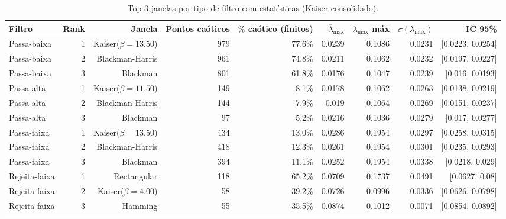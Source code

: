\begin{table}[htbp]
  \centering
  \caption{Top-3 janelas por tipo de filtro com estatísticas (Kaiser consolidado).}
  \begin{tabular}{lrrrrrrrr}
    \toprule
    Filtro & Rank & Janela & Pontos caóticos & $\%$ caótico (finitos) & $\overline{\lambda}_{\max}$ & $\lambda_{\max}$ máx & $\sigma(\lambda_{\max})$ & IC 95\% \\
    \midrule
    Passa-baixa & 1 & Kaiser($\beta=13.50$) & 979 & 77.6\% & 0.0239 & 0.1086 & 0.0231 & [0.0223, 0.0254] \\
    Passa-baixa & 2 & Blackman-Harris & 961 & 74.8\% & 0.0211 & 0.1062 & 0.0232 & [0.0197, 0.0227] \\
    Passa-baixa & 3 & Blackman & 801 & 61.8\% & 0.0176 & 0.1047 & 0.0239 & [0.016, 0.0193] \\
    Passa-alta & 1 & Kaiser($\beta=11.50$) & 149 & 8.1\% & 0.0178 & 0.1062 & 0.0263 & [0.0138, 0.0219] \\
    Passa-alta & 2 & Blackman-Harris & 144 & 7.9\% & 0.019 & 0.1064 & 0.0269 & [0.0151, 0.0237] \\
    Passa-alta & 3 & Blackman & 97 & 5.2\% & 0.0216 & 0.1036 & 0.0279 & [0.017, 0.0277] \\
    Passa-faixa & 1 & Kaiser($\beta=13.50$) & 434 & 13.0\% & 0.0286 & 0.1954 & 0.0297 & [0.0258, 0.0315] \\
    Passa-faixa & 2 & Blackman-Harris & 418 & 12.3\% & 0.0261 & 0.1954 & 0.0301 & [0.0235, 0.0293] \\
    Passa-faixa & 3 & Blackman & 394 & 11.1\% & 0.0252 & 0.1954 & 0.0338 & [0.0218, 0.029] \\
    Rejeita-faixa & 1 & Rectangular & 118 & 65.2\% & 0.0709 & 0.1737 & 0.0491 & [0.0627, 0.08] \\
    Rejeita-faixa & 2 & Kaiser($\beta=4.00$) & 58 & 39.2\% & 0.0726 & 0.0996 & 0.0336 & [0.0626, 0.0798] \\
    Rejeita-faixa & 3 & Hamming & 55 & 35.5\% & 0.0874 & 0.1012 & 0.0071 & [0.0854, 0.0892] \\
    \bottomrule
  \end{tabular}
\end{table}
